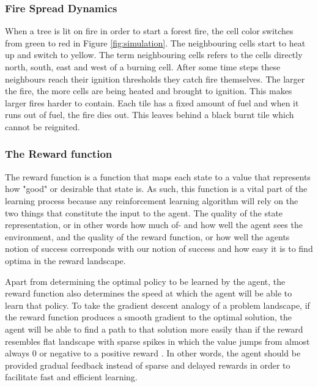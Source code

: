 \subsubsection{Fire Spread Dynamics}\label{sec:fire_spread}
When a tree is lit on fire in order to start a forest fire, the cell color switches from green to red in Figure \ref{fig:simulation}. The neighbouring cells start to heat up and switch to yellow. The term neighbouring cells refers to the cells directly north, south, east and west of a burning cell. After some time steps these neighbours reach their ignition thresholds they catch fire themselves. The larger the fire, the more cells are being heated and brought to ignition. This makes larger fires harder to contain. Each tile has a fixed amount of fuel and when it runs out of fuel, the fire dies out. This leaves behind a black burnt tile which cannot be reignited.


\subsubsection{The Reward function}\label{sec:reward_function}
The reward function is a function that maps each state to a value that represents how "good" or desirable that state is. As such, this function is a vital part of the learning process because any reinforcement learning algorithm will rely on the two things that constitute the input to the agent. The quality of the state representation, or in other words how much of- and how well the agent sees the environment, and the quality of the reward function, or how well the agents notion of success corresponds with our notion of success and how easy it is to find optima in the reward landscape.

Apart from determining the optimal policy to be learned by the agent, the reward function also determines the speed at which the agent will be able to learn that policy. To take the gradient descent analogy of a problem landscape, if the reward function produces a smooth gradient to the optimal solution, the agent will be able to find a path to that solution more easily than if the reward resembles flat landscape with sparse spikes in which the value jumps from almost always 0 or negative to a positive reward \citep{sutton_barto_2018}. In other words, the agent should be provided gradual feedback instead of sparse and delayed rewards in order to facilitate fast and efficient learning.

